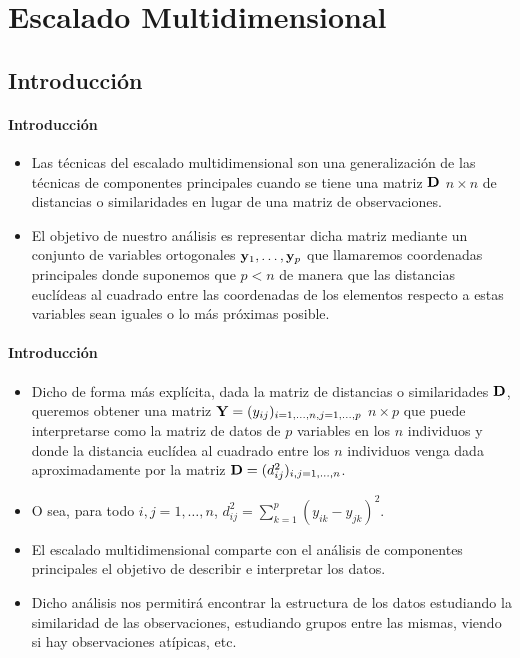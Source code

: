 



\chapter{Escalado Multidimensional}

\section{Introducción}



\begin{frame}
\frametitle{Introducción}

\begin{itemize}
\item<2->{Las técnicas del escalado multidimensional son una generalización de las técnicas de componentes principales cuando se tiene una matriz $\mathbf{D}$ $n\times n$ de distancias o similaridades en lugar de una matriz de observaciones.}
\item<3->{El objetivo de nuestro análisis es representar dicha matriz mediante un conjunto de variables ortogonales $\mathbf{y}_1,\ldots,\mathbf{y}_p$ que llamaremos coordenadas principales donde suponemos que $p<n$ de manera que las distancias euclídeas al cuadrado entre las coordenadas de los elementos respecto a estas variables sean iguales o lo más próximas posible.}
\end{itemize}
\end{frame}

\begin{frame}
\frametitle{Introducción}
\begin{itemize}
\item<2->{Dicho de forma más explícita, dada la matriz de distancias o similaridades $\mathbf{D}$, queremos obtener una matriz $\mathbf{Y}=(y_{ij})_{i=1,\ldots,n,j=1,\ldots,p}$  $n\times p$ que puede interpretarse como la matriz de datos de $p$ variables en los $n$ individuos y donde la distancia euclídea al cuadrado entre los $n$ individuos venga dada aproximadamente por la matriz $\mathbf{D}=(d_{ij}^2)_{i,j=1,\ldots,n}$. }
\item<3->{O sea, para todo $i,j=1,\ldots,n$, $d_{ij}^2 = \sum\limits_{k=1}^p (y_{ik}-y_{jk})^2$.}
\item<4->{El escalado multidimensional comparte con el análisis de componentes principales el objetivo de describir e interpretar los datos.}
\item<5->{Dicho análisis nos permitirá encontrar la estructura de los datos estudiando la similaridad de las observaciones, estudiando grupos entre las mismas, viendo si hay observaciones atípicas, etc.}
\end{itemize}
\end{frame}
